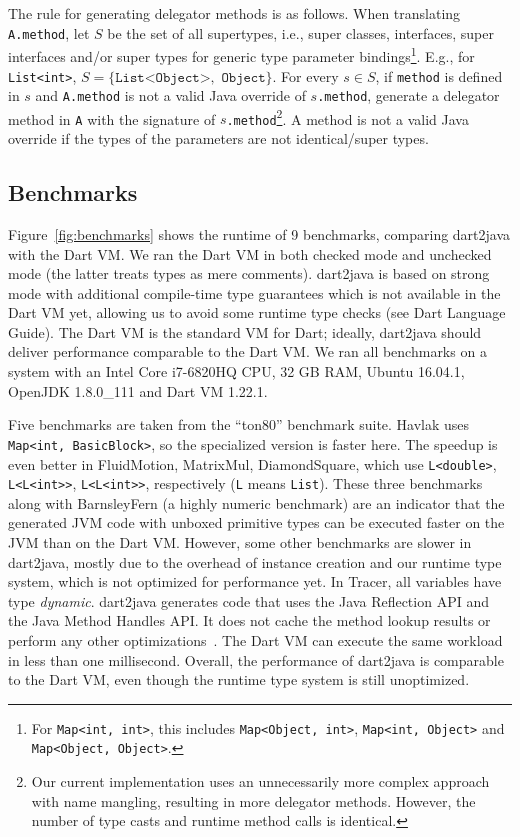 \documentclass[sigplan]{acmart}
\begin{document}
The rule for generating delegator methods is as follows. When translating \texttt{A.method}, let $S$ be the set of all supertypes, i.e., super classes, interfaces, super interfaces and/or super types for generic type parameter bindings\footnote{For \texttt{Map<int, int>}, this includes \texttt{Map<Object, int>}, \texttt{Map<int, Object>} and \texttt{Map<Object, Object>}.}. E.g., for \texttt{List<int>}, $S=\{\texttt{List<Object>},$ $ \texttt{Object} \}$. For every $s \in S$, if \texttt{method} is defined in $s$ and \texttt{A.method} is not a valid Java override of \texttt{$s$.method}, generate a delegator method in \texttt{A} with the signature of \texttt{$s$.method}\footnote{Our current implementation uses an unnecessarily more complex approach with name mangling, resulting in more delegator methods. However, the number of type casts and runtime method calls is identical.}. A method is not a valid Java override if the types of the parameters are not identical/super types.



\subsection{Benchmarks}
Figure~\ref{fig:benchmarks} shows the runtime of 9 benchmarks, comparing dart2java with the Dart VM. We ran the Dart VM in both checked mode and unchecked mode (the latter treats types as mere comments). dart2java is based on strong mode with additional compile-time type guarantees which is not available in the Dart VM yet, allowing us to avoid some runtime type checks (see Dart Language Guide). The Dart VM is the standard VM for Dart; ideally, dart2java should deliver performance comparable to the Dart VM. We ran all benchmarks on a system with an Intel Core i7-6820HQ CPU, 32 GB RAM, Ubuntu 16.04.1, OpenJDK 1.8.0\_111 and Dart VM 1.22.1.

Five benchmarks are taken from the ``ton80'' benchmark suite. Havlak uses \texttt{Map<int, BasicBlock>}, so the specialized version is faster here. The speedup is even better in FluidMotion, MatrixMul, DiamondSquare, which use \texttt{L<double>}, \texttt{L<L<int>{>}},  \texttt{L<L<int>{>}}, respectively (\texttt{L} means \texttt{List}). These three benchmarks along with BarnsleyFern (a highly numeric benchmark) are an indicator that the generated JVM code with unboxed primitive types can be executed faster on the JVM than on the Dart VM. However, some other benchmarks are slower in dart2java, mostly due to the overhead of instance creation and our runtime type system, which is not optimized for performance yet. In Tracer, all variables have type \emph{dynamic}. dart2java generates code that uses the Java Reflection API and the Java Method Handles API. It does not cache the method lookup results or perform any other optimizations~\cite{Marr:2015:ZMR:2737924.2737963}. The Dart VM can execute the same workload in less than one millisecond. Overall, the performance of dart2java is comparable to the Dart VM, even though the runtime type system is still unoptimized.
\end{document}
